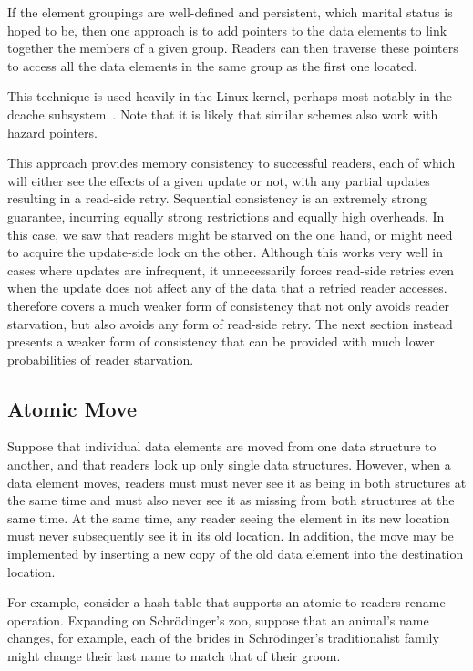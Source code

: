 If the element groupings are well-defined and persistent, which marital
status is hoped to be,
then one approach is to add pointers to the data elements to link
together the members of a given group.
Readers can then traverse these pointers to access all the data elements
in the same group as the first one located.

This technique is used heavily in the Linux kernel, perhaps most
notably in the dcache subsystem~\cite{NeilBrown2015RCUwalk}.
Note that it is likely that similar schemes also work with hazard
pointers.

This approach provides 
{memory consistency} to successful readers,
each of which will either see the effects of a given update or not,
with any partial updates resulting in a read-side retry.
Sequential consistency is an extremely strong guarantee, incurring equally
strong restrictions and equally high overheads.
In this case, we saw that readers might be starved on the one hand, or
might need to acquire the update-side lock on the other.
Although this works very well in cases where updates are infrequent,
it unnecessarily forces read-side retries even when the update does not
affect any of the data that a retried reader accesses.
 therefore covers a much weaker form
of consistency that not only avoids reader starvation, but also avoids
any form of read-side retry.
The next section instead presents a weaker form of consistency that
can be provided with much lower probabilities of reader starvation.

\subsection{Atomic Move}
\label{sec:together:Atomic Move}

Suppose that individual data elements are moved from one data structure
to another, and that readers look up only single data structures.
However, when a data element moves, readers must must never see it as
being in both structures at the same time and must also never see it as
missing from both structures at the same time.
At the same time, any reader seeing the element in its new location
must never subsequently see it in its old location.
In addition, the move may be implemented by inserting a new copy of the
old data element into the destination location.

For example, consider a hash table that supports an atomic-to-readers
rename operation.
Expanding on Schr\"odinger's zoo, suppose that an animal's name changes,
for example, each of the brides in Schr\"odinger's traditionalist family
might change their last name to match that of their groom.


